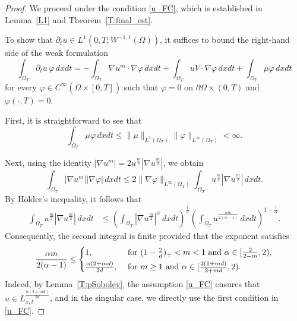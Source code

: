 \documentclass{amsart}
\numberwithin{equation}{section}
\begin{document}
\begin{proof}
We proceed under the condition \eqref{u_FC}, which is established in Lemma~\ref{L1} and Theorem~\ref{T:final_est}. 

To show that $\partial_t u \in L^{1}(0,T;  W^{-1,1}(\Omega))$, it suffices to bound the right-hand side of the weak formulation
\begin{equation}\label{compact01}
\int_{\Omega_T} \partial_t u \,\varphi \,dxdt
=
-\int_{\Omega_T}\nabla u^m\cdot\nabla\varphi\,dxdt
+
\int_{\Omega_T}uV\cdot\nabla\varphi\,dxdt
+
\int_{\Omega_T}\mu\varphi\,dxdt
\end{equation}
for every $\varphi \in C^{\infty}(\overline{\Omega} \times [0,T])$ such that $\varphi = 0$ on $\partial \Omega \times (0,T)$ and $\varphi(\cdot, T)=0$.

First, it is straightforward to see that 
\[
\int_{\Omega_T} \mu \varphi \,dxdt \leq \|\mu\|_{L^1(\Omega_T)}\|\varphi\|_{L^{\infty}(\Omega_T)} < \infty. 
\]

Next, using the identity $|\nabla u^m| = 2 u^{\frac{m}{2}}|\nabla u^{\frac{m}{2}}|$, we obtain 
\begin{equation*}
\int_{\Omega_T} |\nabla u^m| |\nabla\varphi| \,dxdt
\leq 2\|\nabla \varphi\|_{L^{\infty}(\Omega_{T})} \int_{\Omega_T} u^{\frac{m}{2}}|\nabla u^{\frac{m}{2}}| \,dxdt.
\end{equation*}
By H\"{o}lder's inequality, it follows that 
\begin{equation*}
\begin{aligned}
\int_{\Omega_T} u^{\frac{m}{2}}|\nabla u^{\frac{m}{2}}| \,dxdt 
&\leq \left(\int_{\Omega_T} |\nabla u^{\frac{m}{2}}|^{\alpha} \,dxdt\right)^{\frac{1}{\alpha}} \left(\int_{\Omega_T} u^{\frac{\alpha m}{2(\alpha -1)}} \,dxdt\right)^{1-\frac{1}{\alpha}}.
\end{aligned}
\end{equation*}
Consequently, the second integral is finite provided that the exponent satisfies 
\[
\frac{\alpha m}{2(\alpha -1)} \leq
\begin{cases}
	1, & \text{ for } (1-\frac{2}{d})_{+}<m < 1 \text{ and  } \alpha \in [\frac{2}{2-m},2), \vspace{1mm}\\
	\frac{\alpha (2+md)}{2d}, & \text{ for } m \geq 1 \text{ and } \alpha \in [\frac{2(1+md)}{2+md}, 2).
\end{cases}
\]
Indeed, by Lemma~\ref{T:pSobolev}, the assumption \eqref{u_FC} ensures that $u \in L_{x,t}^{\frac{\alpha(2+md)}{2d}}$, and in the singular case, we directly use the first condition in \eqref{u_FC}.



\end{proof}
\end{document}
